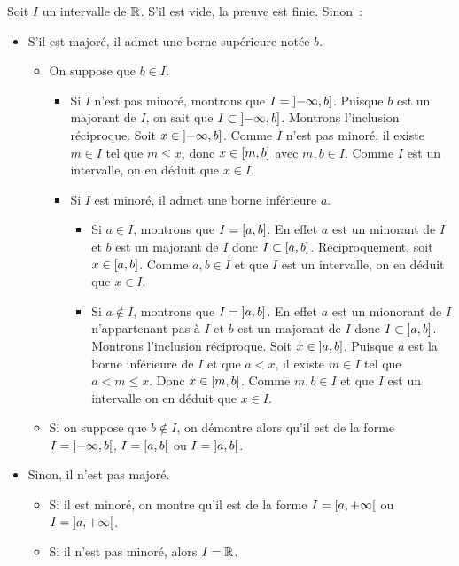 \documentclass{magnolia}
\begin{document}
\begin{preuve}
Soit $I$ un intervalle de $\mathbb{R}$. S'il est vide, la preuve est finie. Sinon~:
\begin{itemize}
\item S'il est majoré, il admet une borne supérieure notée $b$.
  \begin{itemize}
  \item On suppose que $b\in I$.
    \begin{itemize}
    \item Si $I$ n'est pas minoré, montrons que $I=\left]-\infty,b\right]$.
      Puisque $b$ est un majorant de $I$, on sait que
      $I\subset\left]-\infty,b\right]$. Montrons l'inclusion réciproque. Soit
      $x\in\left]-\infty,b\right]$. Comme $I$ n'est pas minoré, il existe
      $m\in I$ tel que $m\leq x$, donc $x\in\left[m,b\right]$ avec $m,b\in I$.
      Comme $I$ est un intervalle, on en déduit que $x\in I$.
    \item Si $I$ est minoré, il admet une borne inférieure $a$.
      \begin{itemize}
      \item Si $a\in I$, montrons que $I=\left[a,b\right]$. En effet $a$ est un
        minorant de $I$ et $b$ est un majorant de $I$ donc
        $I\subset\left[a,b\right]$. Réciproquement, soit $x\in\left[a,b\right]$.
        Comme $a,b\in I$ et que $I$ est un intervalle, on en déduit que
        $x\in I$.
      \item Si $a\not\in I$, montrons que $I=\left]a,b\right]$. En effet $a$
        est un mionorant de $I$ n'appartenant pas à $I$ et $b$ est un majorant
        de $I$ donc $I\subset\left]a,b\right]$. Montrons l'inclusion réciproque.
        Soit $x\in\left]a,b\right]$. Puisque $a$ est la borne inférieure de $I$
        et que $a<x$, il existe $m\in I$ tel que $a<m\leq x$. Donc
        $x\in\left[m,b\right]$. Comme $m,b\in I$ et que $I$ est un intervalle
        on en déduit que $x\in I$.
      \end{itemize}
    \end{itemize}
  \item Si on suppose que $b\not\in I$, on démontre alors qu'il est de la forme
    $I=\left]-\infty,b\right[$, $I=\left[a,b\right[$ ou $I=\left]a,b\right[$.
  \end{itemize}
\item Sinon, il n'est pas majoré.
  \begin{itemize}
  \item Si il est minoré, on montre qu'il est de la forme
    $I=\left[a,+\infty\right[$ ou $I=\left]a,+\infty\right[$.
  \item Si il n'est pas minoré, alors $I=\mathbb{R}$.
  \end{itemize}
\end{itemize}
\end{preuve}
\end{document}
